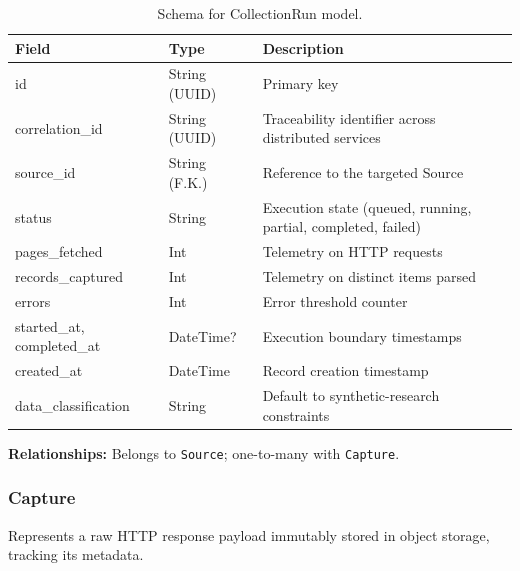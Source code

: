 \begin{table}[h]
\centering
\begin{tabular}{|l|l|l|}
\hline
\textbf{Field} & \textbf{Type} & \textbf{Description} \\
\hline
id & String (UUID) & Primary key \\
correlation\_id & String (UUID) & Traceability identifier across distributed services \\
source\_id & String (F.K.) & Reference to the targeted Source \\
status & String & Execution state (queued, running, partial, completed, failed) \\
pages\_fetched & Int & Telemetry on HTTP requests \\
records\_captured & Int & Telemetry on distinct items parsed \\
errors & Int & Error threshold counter \\
started\_at, completed\_at & DateTime? & Execution boundary timestamps \\
created\_at & DateTime & Record creation timestamp \\
data\_classification & String & Default to synthetic-research constraints \\
\hline
\end{tabular}
\caption{Schema for CollectionRun model.}
\end{table}
\noindent \textbf{Relationships:} Belongs to \texttt{Source}; one-to-many with \texttt{Capture}.

\subsubsection{Capture}
Represents a raw HTTP response payload immutably stored in object storage, tracking its metadata.

